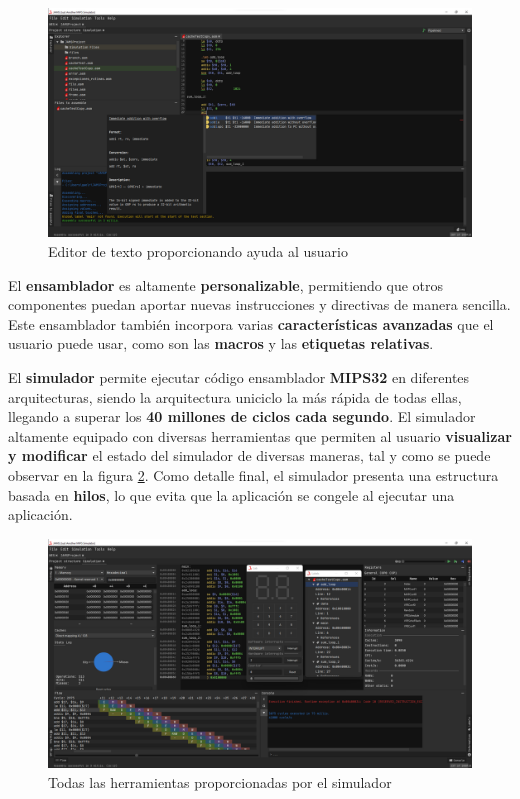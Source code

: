 \begin{figure}[h]
    \centering
    \includegraphics[width=\textwidth]{images/result/mips-editor}
    \caption{Editor de texto proporcionando ayuda al usuario}
    \label{fig:mips-editor}
\end{figure}

El \textbf{ensamblador} es altamente \textbf{personalizable},
permitiendo que otros componentes puedan aportar nuevas instrucciones y
directivas de manera sencilla.
Este ensamblador también incorpora varias \textbf{características avanzadas}
que el usuario puede usar, como son las \textbf{macros} y las
\textbf{etiquetas relativas}.

El \textbf{simulador} permite ejecutar código ensamblador
\textbf{MIPS32} en diferentes arquitecturas, siendo la arquitectura
uniciclo la más rápida de todas ellas, llegando a superar los
\textbf{40 millones de ciclos cada segundo}.
El simulador  altamente equipado con diversas herramientas que
permiten al usuario \textbf{visualizar y modificar} el estado del simulador
de diversas maneras, tal y como se puede observar en la figura \ref{fig:mips-tools}.
Como detalle final, el simulador presenta una estructura basada en
\textbf{hilos}, lo que evita que la aplicación se congele al ejecutar
una aplicación.

\begin{figure}[h]
    \centering
    \includegraphics[width=\textwidth]{images/result/mips-tools}
    \caption{Todas las herramientas proporcionadas por el simulador}
    \label{fig:mips-tools}
\end{figure}
